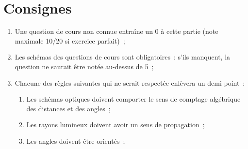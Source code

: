 \documentclass[a4paper, 12pt, final, garamond]{book}
\begin{document}
\section{Consignes}
\begin{enumerate}
    \item Une question de cours non connue entraîne un 0 à cette partie (note
        maximale 10/20 si exercice parfait)~;
    \item Les schémas des questions de cours sont obligatoires~: s'ils manquent,
        la question ne saurait être notée au-dessus de 5~;
    \item Chacune des règles suivantes qui ne serait respectée enlèvera un demi
        point~:
        \begin{enumerate}
            \item Les schémas optiques doivent comporter le sens de comptage
                algébrique des distances et des angles~;
            \item Les rayons lumineux doivent avoir un sens de propagation~;
            \item Les angles doivent être orientés~;
        \end{enumerate}
\end{enumerate}
\end{document}
